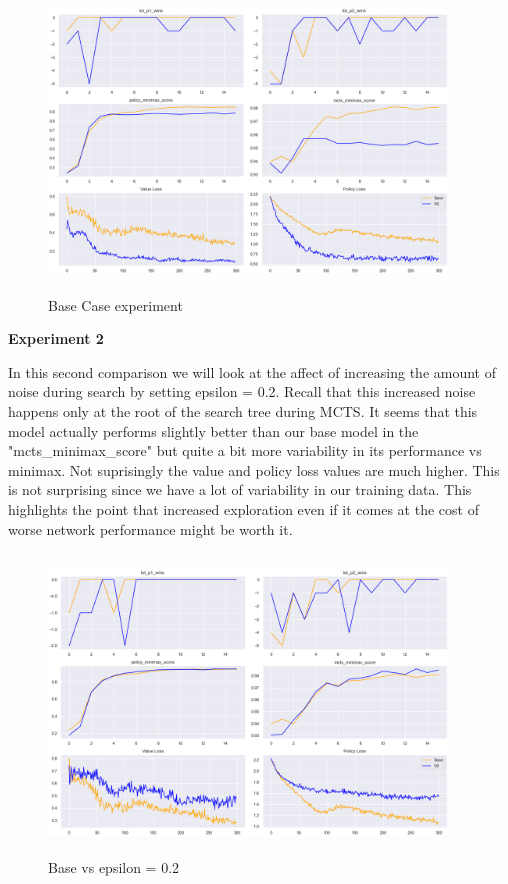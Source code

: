 \begin{figure}[H]
       \centering
       \includegraphics[width=400px,height=300px]{experiments/base_vs_t=2.png}
       \caption{Base Case experiment}
       \label{fig:my_label}
\end{figure}




\textbf{Experiment 2}

In this second comparison we will look at the affect of increasing the amount of noise during search by setting epsilon = 0.2. Recall that this increased noise happens only at the root of the search tree during MCTS. It seems that this model actually performs slightly better than our base model in the "mcts\_minimax\_score" but quite a bit more variability in its performance vs minimax. Not suprisingly the value and policy loss values are much higher. This is not surprising since we have a lot of variability in our training data. This highlights the point that increased exploration even if it comes at the cost of worse network performance might be worth it. 

\begin{figure}[H]
       \centering
       \includegraphics[width=400px,height=300px]{experiments/base_vs_eps=0_2.png}
       \caption{Base vs epsilon = 0.2}
       \label{fig:my_label}
\end{figure}



